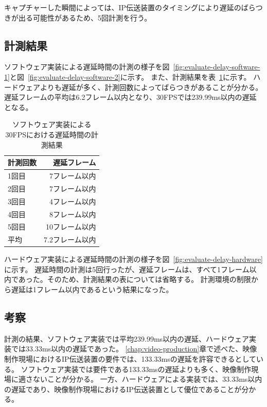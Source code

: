 キャプチャーした瞬間によっては、IP伝送装置のタイミングにより遅延のばらつきが出る可能性があるため、5回計測を行う。

\subsection{計測結果}


ソフトウェア実装による遅延時間の計測の様子を図~\ref{fig:evaluate-delay-software-1}と図~\ref{fig:evaluate-delay-software-2}に示す。
また、計測結果を表~\ref{tb:evaluate-software-delay}に示す。
ハードウェアよりも遅延が多く、計測回数によってばらつきがあることが分かる。
遅延フレームの平均は6.2フレーム以内となり、30FPSでは239.99ms以内の遅延となる。

\begin{table}[htbp]
  \caption{ソフトウェア実装による30FPSにおける遅延時間の計測結果}
  \label{tb:evaluate-software-delay}
  \begin{center}
  \begin{tabular}{l|r}
    \hline
     計測回数 & 遅延フレーム \\\hline\hline
     1回目 & 7フレーム以内   \\\hline
     2回目 & 7フレーム以内   \\\hline
     3回目 & 4フレーム以内   \\\hline
     4回目 & 8フレーム以内   \\\hline
     5回目 & 10フレーム以内   \\\hline\hline
      平均 & 7.2フレーム以内   \\\hline
  \end{tabular}\end{center}
\end{table}

ハードウェア実装による遅延時間の計測の様子を図~\ref{fig:evaluate-delay-hardware}に示す。
遅延時間の計測は5回行ったが、遅延フレームは、すべて1フレーム以内であった。そのため、計測結果の表については省略する。
計測環境の制限から遅延は1フレーム以内であるという結果になった。

\subsection{考察}

計測の結果、ソフトウェア実装では平均239.99ms以内の遅延、ハードウェア実装では33.33ms以内の遅延であった。
\ref{chap:video-production}章で述べた、映像制作現場におけるIP伝送装置の要件では、133.33msの遅延を許容できるとしている。
ソフトウェア実装では要件である133.33msの遅延よりも多く、映像制作現場に適さないことが分かる。
一方、ハードウェアによる実装では、33.33ms以内の遅延であり、映像制作現場におけるIP伝送装置として優位であることが分かる。


